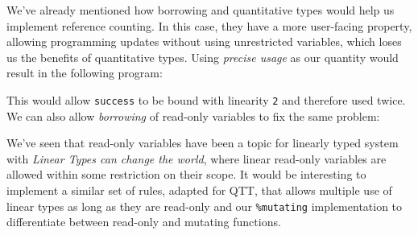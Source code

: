 \documentclass[
]{article}
\newenvironment{Shaded}{}{}
\newcommand{\CommentTok}[1]{\textcolor[rgb]{0.38,0.63,0.69}{\textit{#1}}}
\newcommand{\DataTypeTok}[1]{\textcolor[rgb]{0.56,0.13,0.00}{#1}}
\newcommand{\DecValTok}[1]{\textcolor[rgb]{0.25,0.63,0.44}{#1}}
\newcommand{\FunctionTok}[1]{\textcolor[rgb]{0.02,0.16,0.49}{#1}}
\newcommand{\KeywordTok}[1]{\textcolor[rgb]{0.00,0.44,0.13}{\textbf{#1}}}
\newcommand{\NormalTok}[1]{#1}
\newcommand{\OperatorTok}[1]{\textcolor[rgb]{0.40,0.40,0.40}{#1}}
\newcommand{\OtherTok}[1]{\textcolor[rgb]{0.00,0.44,0.13}{#1}}
\newcommand{\StringTok}[1]{\textcolor[rgb]{0.25,0.44,0.63}{#1}}
\begin{document}
We've already mentioned how borrowing and quantitative types would help
us implement reference counting. In this case, they have a more
user-facing property, allowing programming updates without using
unrestricted variables, which loses us the benefits of quantitative
types. Using \emph{precise usage} as our quantity would result in the
following program:

\begin{Shaded}
\end{Shaded}

This would allow \texttt{success} to be bound with linearity \texttt{2}
and therefore used twice. We can also allow \emph{borrowing} of
read-only variables to fix the same problem:

\begin{Shaded}
\end{Shaded}

We've seen that read-only variables have been a topic for linearly typed
system with \emph{Linear Types can change the
world}\cite{linear_types_update}, where linear read-only variables are
allowed within some restriction on their scope. It would be interesting
to implement a similar set of rules, adapted for QTT, that allows
multiple use of linear types as long as they are read-only and our
\texttt{\%mutating} implementation to differentiate between read-only
and mutating functions.
\end{document}
